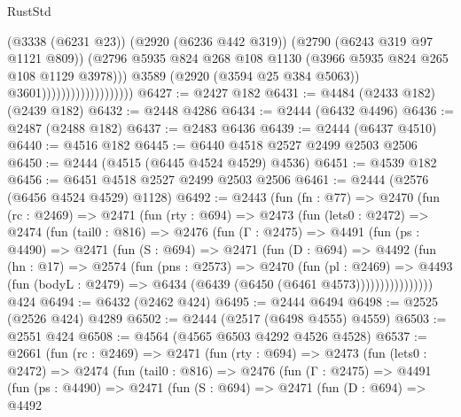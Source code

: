 \begin{lexlean}{RustStd}
\begin{coremodule}
                                            (@3338 (@6231 @23))
                                            (@2920 (@6236 @442 @319))
                                            (@2790 (@6243 @319 @97 @1121 @809))
                                            (@2796
                                              @5935
                                              @824
                                              @268
                                              @108
                                              @1130
                                              (@3966 @5935 @824 @265 @108 @1129 @3978)))
                                          @3589
                                          (@2920 (@3594 @25 @384 @5063))
                                          @3601)))))))))))))))))))
@6427 := @2427 @182
@6431 := @4484 (@2433 @182) (@2439 @182)
@6432 := @2448 @4286
@6434 := @2444 (@6432 @4496)
@6436 := @2487 (@2488 @182)
@6437 := @2483 @6436
@6439 := @2444 (@6437 @4510)
@6440 := @4516 @182
@6445 := @6440 @4518 @2527 @2499 @2503 @2506
@6450 := @2444 (@4515 (@6445 @4524 @4529) @4536)
@6451 := @4539 @182
@6456 := @6451 @4518 @2527 @2499 @2503 @2506
@6461 := @2444 (@2576 (@6456 @4524 @4529) @1128)
@6492 := @2443
    (fun (fn : @77) =>
    @2470
      (fun (rc : @2469) =>
      @2471
        (fun (rty : @694) =>
        @2473
          (fun (lets0 : @2472) =>
          @2474
            (fun (tail0 : @816) =>
            @2476
              (fun (Γ : @2475) =>
              @4491
                (fun (ps : @4490) =>
                @2471
                  (fun (S : @694) =>
                  @2471
                    (fun (D : @694) =>
                    @4492
                      (fun (hn : @17) =>
                      @2574
                        (fun (pns : @2573) =>
                        @2470
                          (fun (pl : @2469) =>
                          @4493
                            (fun (bodyL : @2479) => @6434 (@6439 (@6450 (@6461 @4573))))))))))))))))
    @424
@6494 := @6432 (@2462 @424)
@6495 := @2444 @6494
@6498 := @2525 (@2526 @424) @4289
@6502 := @2444 (@2517 (@6498 @4555) @4559)
@6503 := @2551 @424
@6508 := @4564 (@4565 @6503 @4292 @4526 @4528)
@6537 := @2661
    (fun (rc : @2469) =>
    @2471
      (fun (rty : @694) =>
      @2473
        (fun (lets0 : @2472) =>
        @2474
          (fun (tail0 : @816) =>
          @2476
            (fun (Γ : @2475) =>
            @4491
              (fun (ps : @4490) =>
              @2471
                (fun (S : @694) =>
                @2471
                  (fun (D : @694) =>
                  @4492

\end{coremodule}
\end{lexlean}
